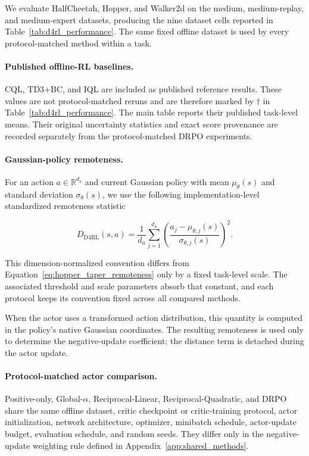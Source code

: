 \documentclass{article}
\theoremstyle{plain}
\theoremstyle{definition}
\theoremstyle{remark}
\begin{document}
We evaluate HalfCheetah, Hopper, and Walker2d on the medium,
medium-replay, and medium-expert datasets, producing the nine dataset cells
reported in Table~\ref{tab:d4rl_performance}. The same fixed offline
dataset is used by every protocol-matched method within a task.

\paragraph{Published offline-RL baselines.}

CQL, TD3+BC, and IQL are included as published reference results.
These values are not protocol-matched reruns and are therefore marked
by \(\dagger\) in Table~\ref{tab:d4rl_performance}. The main table
reports their published task-level means. Their original uncertainty
statistics and exact score provenance are recorded separately from the
protocol-matched DRPO experiments.

\paragraph{Gaussian-policy remoteness.}

For an action \(a\in\mathbb{R}^{d_a}\) and current Gaussian policy with
mean \(\mu_\theta(s)\) and standard deviation \(\sigma_\theta(s)\), we use the
following implementation-level standardized remoteness statistic

\[
D_{\mathrm{D4RL}}(s,a)
=
\frac{1}{d_a}
\sum_{j=1}^{d_a}
\left(
\frac{a_j-\mu_{\theta,j}(s)}
     {\sigma_{\theta,j}(s)}
\right)^2.
\]

This dimension-normalized convention differs from
Equation~\eqref{eq:hopper_taper_remoteness} only by a fixed task-level scale.
The associated threshold and scale parameters absorb that constant, and each
protocol keeps its convention fixed across all compared methods.

When the actor uses a transformed action distribution, this quantity is
computed in the policy's native Gaussian coordinates. The resulting
remoteness is used only to determine the negative-update coefficient;
the distance term is detached during the actor update.

\paragraph{Protocol-matched actor comparison.}

Positive-only, Global-\(\alpha\), Reciprocal-Linear,
Reciprocal-Quadratic, and DRPO share the same offline dataset, critic
checkpoint or critic-training protocol, actor initialization, network
architecture, optimizer, minibatch schedule, actor-update budget,
evaluation schedule, and random seeds. They differ only in the
negative-update weighting rule defined in
Appendix~\ref{app:shared_methods}.
\end{document}
